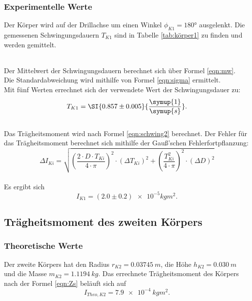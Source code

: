 \subsubsection{Experimentelle Werte}
Der Körper wird auf der Drillachse um einen Winkel $\phi_{K1}=180°$ ausgelenkt.
Die gemessenen Schwingungsdauern $T_{K1}$ sind in Tabelle \ref{tab:körper1} zu finden und werden gemittelt.

\\Der Mittelwert der Schwingungsdauern berechnet sich über Formel \eqref{eqn:mw}.
\\Die Standardabweichung wird mithilfe von Formel \eqref{eqn:sigma} ermittelt.
\\Mit fünf Werten errechnet sich der verwendete Wert der Schwingungsdauer zu:
\begin{equation*}
  T_{K1}=\SI{0.857 \pm 0.005}{\frac{\symup{1}}{\symup{s}}}.
\end{equation*}
\\Das Trägheitsmoment wird nach Formel \eqref{eqn:schwing2} berechnet.
Der Fehler für das Trägheitsmoment berechnet sich mithilfe der Gauß'schen Fehlerfortpflanzung:
\begin{equation}
  \Delta I_{Ki}= \sqrt{ \left(\frac{2 \cdot D \cdot T_{Ki}}{4 \cdot \pi}\right)^2 \cdot (\Delta T_{Ki})^2 + \left(\frac{T_{Ki}^2}{4 \cdot \pi}\right)^2 \cdot (\Delta D)^2 }
\label{eqn:gaussk}
\end{equation}
\\Es ergibt sich
\begin{equation*}
  I_{K1}= (\num{2.0} \pm \num{0.2}) \num{e-5} \si{kg m^2}.
\end{equation*}

\subsection{Trägheitsmoment des zweiten Körpers}

\subsubsection{Theoretische Werte}
Der zweite Körpers hat den Radius $r_{K2}= \SI{0.03745}{m}$,  die Höhe $h_{K2}= \SI{0.030}{m}$ und die Masse $m_{K2}= \SI{1.1194}{kg}$.
Das errechnete Trägheitsmoment des Körpers nach der Formel \eqref{eqn:Zs} beläuft sich auf
\begin{equation*}
  I_{Theo, K2}= \SI{7.9e-4}{kg m^2}.
\end{equation*}


